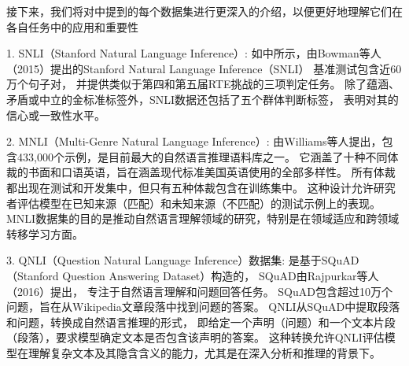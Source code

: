 
接下来，我们将对中提到的每个数据集进行更深入的介绍，以便更好地理解它们在各自任务中的应用和重要性

1. SNLI（Stanford Natural Language Inference）:
如中所示，由Bowman等人（2015）\cite{bowman2015large}提出的Stanford Natural Language Inference（SNLI）
基准测试包含近60万个句子对，
并提供类似于第四和第五届RTE挑战\cite{giampiccolo2008fourth,bentivogli2009fifth}的三项判定任务。
除了蕴涵、矛盾或中立的金标准标签外，SNLI数据还包括了五个群体判断标签，
表明对其的信心或一致性水平。

2. MNLI（Multi-Genre Natural Language Inference）: 
由Williams等人提出\cite{williams2018broad}，包含433,000个示例，是目前最大的自然语言推理语料库之一。
它涵盖了十种不同体裁的书面和口语英语，旨在涵盖现代标准美国英语使用的全部多样性。
所有体裁都出现在测试和开发集中，但只有五种体裁包含在训练集中。
这种设计允许研究者评估模型在已知来源（匹配）和未知来源（不匹配）的测试示例上的表现。
MNLI数据集的目的是推动自然语言理解领域的研究，特别是在领域适应和跨领域转移学习方面。

3. QNLI（Question Natural Language Inference）数据集\cite{wang2018glue}: 
是基于SQuAD（Stanford Question Answering Dataset）\cite{rajpurkar2016squad}构造的，
SQuAD由Rajpurkar等人（2016）提出，
专注于自然语言理解和问题回答任务。
SQuAD包含超过10万个问题，旨在从Wikipedia文章段落中找到问题的答案。
QNLI从SQuAD中提取段落和问题，转换成自然语言推理的形式，
即给定一个声明（问题）和一个文本片段（段落），要求模型确定文本是否包含该声明的答案。
这种转换允许QNLI评估模型在理解复杂文本及其隐含含义的能力，尤其是在深入分析和推理的背景下。

